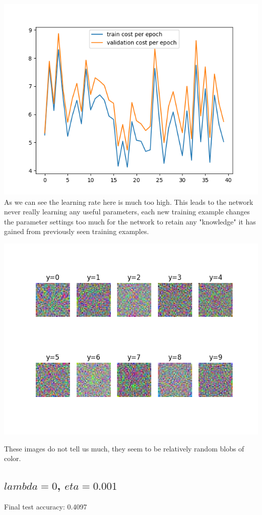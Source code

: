 \documentclass[11pt,a4paper]{article}
\begin{document}
\includegraphics[width=\textwidth]{eta_0.1_lambda_0.png}
As we can see the learning rate here is much too high. This leads to the network never really learning any useful parameters, each new training example changes the parameter settings too much for the network to retain any "knowledge" it has gained from previously seen training examples.

\includegraphics[width=\textwidth]{eta_0.1_lambda_0_montage.png}

These images do not tell us much, they seem to be relatively random blobs of color.


\subsection{$lambda=0$, $eta=0.001$}
Final test accuracy: 0.4097
\end{document}
